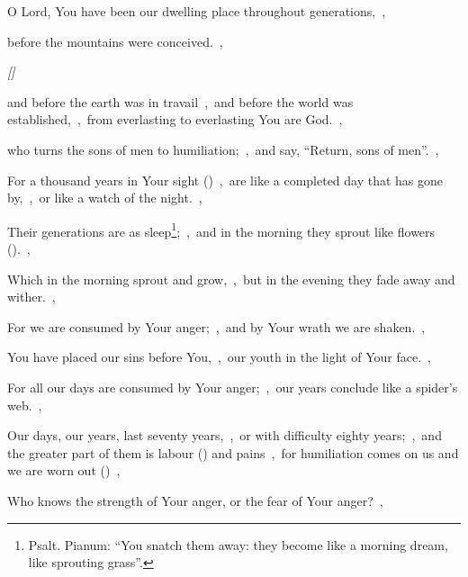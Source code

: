 \documentclass[12pt,twoside,a5paper]{article}
\begin{document}



\begin{normalparskip}
  O Lord, You have been our dwelling place throughout generations,~\sep

  before the mountains were conceived.~\sep


  \emph{[]}

  and before the earth was in travail~\sep\ and before the world was established,~\sep\ from everlasting to everlasting You are God.~\sep

  who turns the sons of men to humiliation;~\sep\ and say, ``Return, sons of men''.~\sep

  For a thousand years in Your sight ()~\sep\ are like a completed day that has gone by,~\sep\ or like a watch of the night.~\sep

  Their generations are as sleep\footnote{Psalt. Pianum: ``You snatch them away: they become like a morning dream, like sprouting grass''.};~\sep\ and in the morning they sprout like flowers ().~\sep

  Which in the morning sprout and grow,~\sep\ but in the evening they fade away and wither.~\sep

  For we are consumed by Your anger;~\sep\ and by Your wrath we are shaken.~\sep

  You have placed our sins before You,~\sep\ our youth in the light of Your face.~\sep

  For all our days are consumed by Your anger;~\sep\ our years conclude like a spider's web.~\sep

  Our days, our years, last seventy years,~\sep\ or with difficulty eighty years;~\sep\ and the greater part of them is labour () and pains~\sep\ for humiliation comes on us and we are worn out ()~\sep

  Who knows the strength of Your anger, or the fear of Your anger?~\sep


\end{normalparskip}
\end{document}
